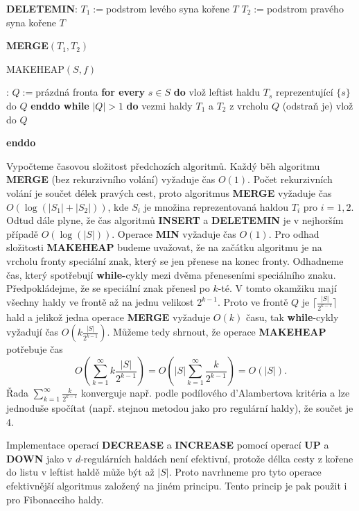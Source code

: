 \documentclass[a4paper,12pt]{article}
\begin{document}
{\bf DELETEMIN}:\newline 
$T_1:=$podstrom levého syna kořene $T$\newline 
$T_2:=$podstrom pravého syna kořene $T$\newline 
{\bf MERGE$(T_1,T_2)$

MAKEHEAP$(S,f)$}:\newline 
$Q:=$prázdná fronta\newline 
{\bf for every} $s\in S$ {\bf do\newline 
\phantom{{\rm ---}}}vlož leftist haldu $T_s$ reprezentující $
\{s\}$ do $Q$\newline 
{\bf enddo\newline 
while} $|Q|>1$ {\bf do\newline 
\phantom{{\rm ---}}}vezmi haldy $T_1$ a $T_2$ z vrcholu $Q$ 
(odstraň je)\newline 
\phantom{---}{\bf MERGE$(T_1,T_2)$} vlož do $Q$\newline 
{\bf enddo

}
Vypočteme časovou složitost předchozích 
algoritmů. Každý běh 
algoritmu {\bf MERGE} (bez rekurzivního volání) vyžaduje čas 
$O(1)$. Počet rekurzivních volání je součet délek pravých 
cest, proto algoritmus {\bf MERGE} vyžaduje čas $O(\log(|S_
1|+|S_2|))$, 
kde $S_i$ je množina reprezentovaná haldou $T_i$ pro $i=1,2$.
Odtud dále plyne, že čas algoritmů {\bf INSERT} a 
{\bf DELETE\-MIN} je v 
nejhorším případě $O(\log(|S|))$. Operace {\bf MIN} vyžaduje 
čas $O(1)$. Pro odhad složitosti {\bf MA\-KEHEAP} budeme 
uvažovat, že na začátku algoritmu je na vrcholu fronty 
speciální znak, který se jen přenese na konec fronty. 
Odhadneme čas, který spotřebují {\bf while-}cykly mezi dvě\-ma 
přeneseními speciálního znaku. Předpokládejme, že se 
spe\-ciál\-ní znak přenesl po $k$-té. V tomto okamžiku 
mají všechny haldy ve frontě až na jednu velikost $2^{
k-1}$. 
Proto ve frontě $Q$ je $\big\lceil \frac {|S|}{2^{k-1}}\big\rceil $ hald a jelikož jedna operace 
{\bf MERGE} vyžadu\-je $O(k)$ času, tak {\bf while}-cykly vyžadují 
čas $O(k\frac {|S|}{2^{k-1}})$. Můžeme tedy shrnout, že operace 
{\bf MAKEHEAP} potřebuje čas 
$$O(\sum_{k=1}^{\infty}k\frac {|S|}{2^{k-1}})=O(|S|\sum_{k=1}^{\infty}\frac 
k{2^{k-1}})=O(|S|).$$
\v Rada $\sum_{k=1}^{\infty}$$\frac k{2^{k-1}}$ konverguje např. podle podílového d'Alambertova 
kritéria a lze jednoduše spočítat (např. stejnou metodou 
jako pro regulární haldy), že součet je $4$.

Implementace operací {\bf DECREASE} a {\bf INCREASE} pomocí 
operací {\bf UP} a {\bf DOWN} jako v $d$-regulárních haldách není 
efektivní, protože délka cesty z kořene do listu v leftist haldě 
může být až $|S|$.  Proto navrhneme pro tyto operace 
efektivnější algoritmus založený na jiném principu.  Tento princip 
je pak použit i pro Fibonacciho haldy.  
\end{document}
